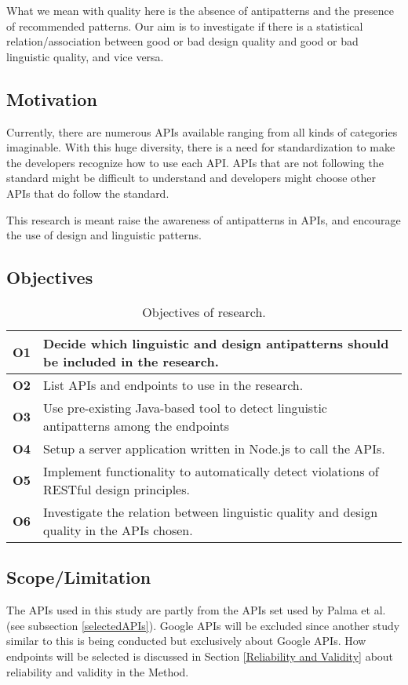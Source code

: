 What we mean with quality here is the absence of antipatterns and the presence of recommended patterns. Our aim is to investigate if there is a statistical relation/association between good or bad design quality and good or bad linguistic quality, and vice versa. 

\subsection{Motivation}
Currently, there are numerous APIs available ranging from all kinds of categories imaginable. With this huge diversity, there is a need for standardization to make the developers recognize how to use each API. APIs that are not following the standard might be difficult to understand and developers might choose other APIs that do follow the standard.

This research is meant raise the awareness of antipatterns in APIs, and encourage the use of design and linguistic patterns. 

\subsection{Objectives}


\begin{table}[!ht]
\begin{center}
\begin{tabular} {|p{1.2cm}|p{11.6cm}|} \hline
\textbf{O1} & Decide which linguistic and design antipatterns should be included in the research. \\ \hline
\textbf{O2} & List APIs and endpoints to use in the research. \\ \hline
\textbf{O3} & Use pre-existing Java-based tool to detect linguistic antipatterns among the endpoints \\ \hline
\textbf{O4} & Setup a server application written in Node.js to call the APIs. \\ \hline
\textbf{O5} & Implement functionality to automatically detect violations of RESTful design principles.\\ \hline
\textbf{O6} & Investigate the relation between linguistic quality and design quality in the APIs chosen. \\ \hline
\end{tabular}
 \caption{Objectives of research.}
 \label{tab:Objectives}
\end{center} 
\end{table}

\subsection{Scope/Limitation}
The APIs used in this study are partly from the APIs set used by Palma et al. \cite{linguistic} (see subsection \ref{selectedAPIs}). Google APIs will be excluded since another study similar to this is being conducted but exclusively about Google APIs. How endpoints will be selected is discussed in Section \ref{Reliability and Validity} about reliability and validity in the Method.


